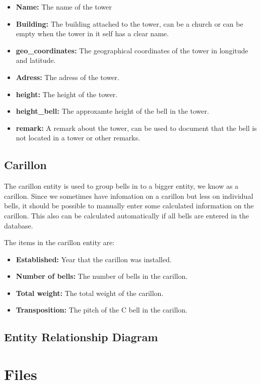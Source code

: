 \documentclass[11pt, a4paper]{article}
\begin{document}
\begin{itemize}
\begin{itemize}
    \item \textbf{Name:} The name of the tower
    \item \textbf{Building:} The building attached to the tower, can be a church or can be empty when the tower in it self has a clear name.
    \item \textbf{geo_coordinates:} The geographical coordinates of the tower in longitude and latitude.
    \item \textbf{Adress:} The adress of the tower.
    \item \textbf{height:} The height of the tower.
    \item \textbf{height_bell:} The approxamte height of the bell in the tower.
    \item \textbf{remark:} A remark about the tower, can be used to document that the bell is not located in a tower or other remarks.
\end{itemize}

\subsection{Carillon}

The carillon entity is used to group bells in to a bigger entity, we know as a carillon. Since we sometimes have infomation on  a carillon but less on individual bells,
it should be possible to manually enter some calculated information on the carillon.
This also can be calculated automatically if all bells are entered in the database. 

The items in the carillon entity are:

\begin{itemize}
    \item \textbf{Established:} Year that the carillon was installed.
    \item \textbf{Number of bells:} The number of bells in the carillon.
    \item \textbf{Total weight:} The total weight of the carillon.
    \item \textbf{Transposition:} The pitch of the C bell in the carillon.
\end{itemize}

\subsection{Entity Relationship Diagram}

\section{Files}


\end{itemize}
\end{document}
